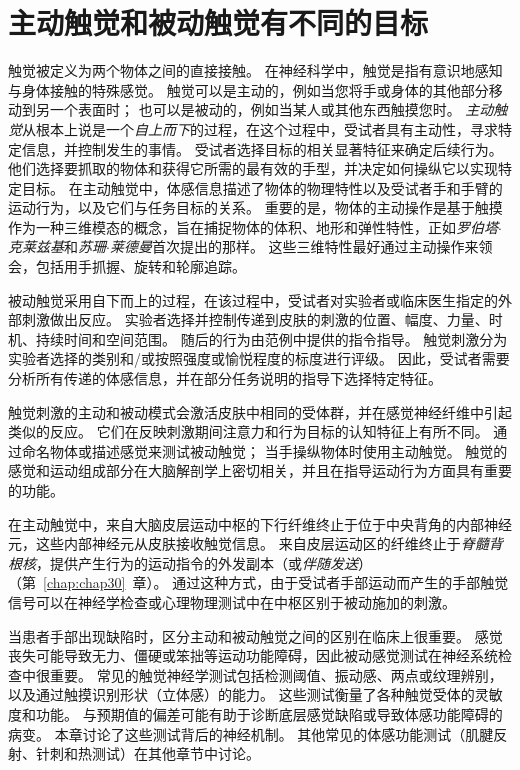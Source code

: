 \section{主动触觉和被动触觉有不同的目标}

触觉被定义为两个物体之间的直接接触。
在神经科学中，触觉是指有意识地感知与身体接触的特殊感觉。
触觉可以是主动的，例如当您将手或身体的其他部分移动到另一个表面时；
也可以是被动的，例如当某人或其他东西触摸您时。
\textit{主动触觉}从根本上说是一个\textit{自上而下}的过程，在这个过程中，受试者具有主动性，寻求特定信息，并控制发生的事情。
受试者选择目标的相关显著特征来确定后续行为。
他们选择要抓取的物体和获得它所需的最有效的手型，并决定如何操纵它以实现特定目标。
在主动触觉中，体感信息描述了物体的物理特性以及受试者手和手臂的运动行为，以及它们与任务目标的关系。
重要的是，物体的主动操作是基于触摸作为一种三维模态的概念，旨在捕捉物体的体积、地形和弹性特性，正如\textit{罗伯塔$\cdot$克莱兹基}和\textit{苏珊$\cdot$莱德曼}首次提出的那样。
这些三维特性最好通过主动操作来领会，包括用手抓握、旋转和轮廓追踪。


被动触觉采用自下而上的过程，在该过程中，受试者对实验者或临床医生指定的外部刺激做出反应。
实验者选择并控制传递到皮肤的刺激的位置、幅度、力量、时机、持续时间和空间范围。
随后的行为由范例中提供的指令指导。
触觉刺激分为实验者选择的类别和/或按照强度或愉悦程度的标度进行评级。
因此，受试者需要分析所有传递的体感信息，并在部分任务说明的指导下选择特定特征。


触觉刺激的主动和被动模式会激活皮肤中相同的受体群，并在感觉神经纤维中引起类似的反应。
它们在反映刺激期间注意力和行为目标的认知特征上有所不同。
通过命名物体或描述感觉来测试被动触觉；
当手操纵物体时使用主动触觉。
触觉的感觉和运动组成部分在大脑解剖学上密切相关，并且在指导运动行为方面具有重要的功能。


在主动触觉中，来自大脑皮层运动中枢的下行纤维终止于位于中央背角的内部神经元，这些内部神经元从皮肤接收触觉信息。
来自皮层运动区的纤维终止于\textit{脊髓背根核}，提供产生行为的运动指令的外发副本（或\textit{伴随发送}）（第~\ref{chap:chap30}~章）。
通过这种方式，由于受试者手部运动而产生的手部触觉信号可以在神经学检查或心理物理测试中在中枢区别于被动施加的刺激。


当患者手部出现缺陷时，区分主动和被动触觉之间的区别在临床上很重要。
感觉丧失可能导致无力、僵硬或笨拙等运动功能障碍，因此被动感觉测试在神经系统检查中很重要。
常见的触觉神经学测试包括检测阈值、振动感、两点或纹理辨别，以及通过触摸识别形状（立体感）的能力。 
这些测试衡量了各种触觉受体的灵敏度和功能。
与预期值的偏差可能有助于诊断底层感觉缺陷或导致体感功能障碍的病变。
本章讨论了这些测试背后的神经机制。
其他常见的体感功能测试（肌腱反射、针刺和热测试）在其他章节中讨论。



